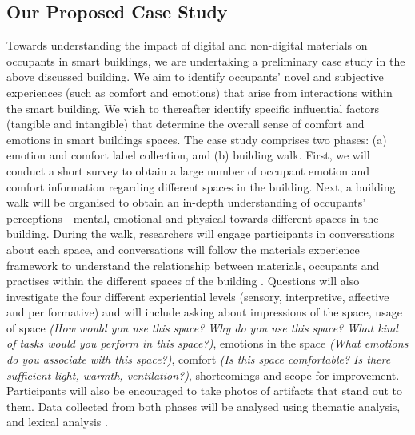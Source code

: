 \documentclass[manuscript, anonymous, review]{acmart}
\begin{document}
\subsection{Our Proposed Case Study} 
Towards understanding the impact of digital and non-digital materials on occupants in smart buildings, we are undertaking a preliminary case study in the above discussed building. We aim to identify occupants' novel and subjective experiences (such as comfort and emotions) that arise from interactions within the smart building. We wish to thereafter identify specific influential factors (tangible and intangible) that determine the overall sense of comfort and emotions in smart buildings spaces. The case study comprises two phases: (a) emotion and comfort label collection, and (b) building walk. First, we will conduct a short survey to obtain a large number of occupant emotion and comfort information regarding different spaces in the building. Next, a building walk will be organised to obtain an in-depth understanding of occupants' perceptions - mental, emotional and physical towards different spaces in the building. During the walk, researchers will engage participants in conversations about each space, and conversations will follow the materials experience framework to understand the relationship between materials, occupants and practises within the different spaces of the building \cite{giaccardi2015foundations}. Questions will also investigate the four different experiential levels (sensory, interpretive, affective and per formative) and will include asking about impressions of the space, usage of space \textit{(How would you use this space? Why do you use this space? What kind of tasks would you perform in this space?)}, emotions in the space \textit{(What emotions do you associate with this space?)}, comfort \textit{(Is this space comfortable? Is there sufficient light, warmth, ventilation?)}, shortcomings and scope for improvement. Participants will also be encouraged to take photos of artifacts that stand out to them. Data collected from both phases will be analysed using thematic analysis, and lexical analysis \cite{braun2006using, xue2020mood}. 


\end{document}
